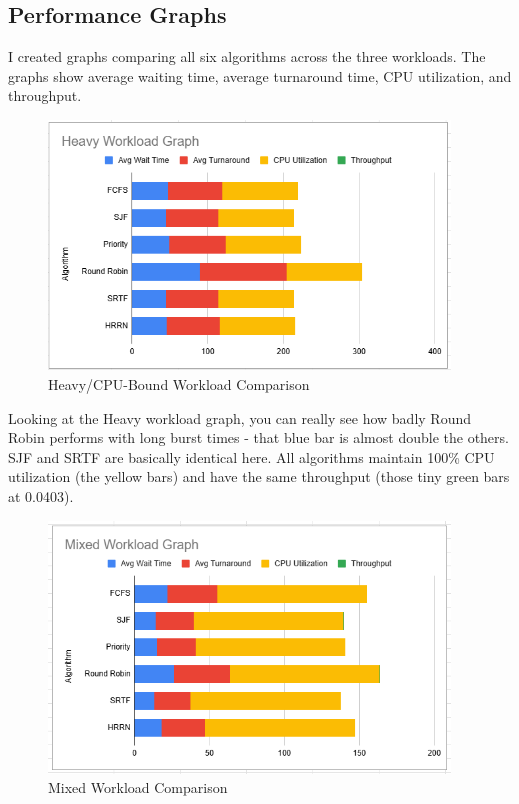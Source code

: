 \documentclass[12pt,letterpaper]{article}
\begin{document}
\newpage

\subsection{Performance Graphs}

I created graphs comparing all six algorithms across the three workloads. The 
graphs show average waiting time, average turnaround time, CPU utilization, and 
throughput.

\begin{figure}[H]
    \centering
    \includegraphics[width=0.95\textwidth]{heavy_workload_graph.png}
    \caption{Heavy/CPU-Bound Workload Comparison}
    \label{fig:heavy_graph}
\end{figure}

Looking at the Heavy workload graph, you can really see how badly Round Robin 
performs with long burst times - that blue bar is almost double the others. SJF 
and SRTF are basically identical here. All algorithms maintain 100\% CPU 
utilization (the yellow bars) and have the same throughput (those tiny green 
bars at 0.0403).

\begin{figure}[H]
    \centering
    \includegraphics[width=0.95\textwidth]{mixed_workload_graph.png}
    \caption{Mixed Workload Comparison}
    \label{fig:mixed_graph}
\end{figure}
\end{document}
